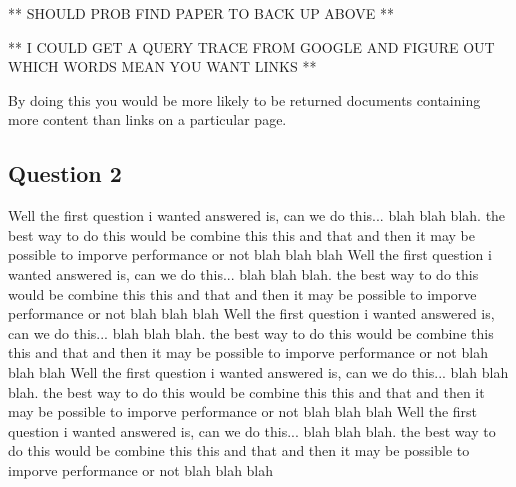 \documentclass{acm_proc_article-sp}
\begin{document}
** SHOULD PROB FIND PAPER TO BACK UP ABOVE **

** I COULD GET A QUERY TRACE FROM GOOGLE AND FIGURE OUT WHICH WORDS MEAN YOU WANT LINKS **

By doing this you would be more likely to be returned documents containing more content than links on a particular page.

\subsection{Question 2}
Well the first question i wanted answered is, can we do this... blah blah blah. the best way to do this would be combine this this and that and then it may be possible to imporve performance or not blah blah blah
Well the first question i wanted answered is, can we do this... blah blah blah. the best way to do this would be combine this this and that and then it may be possible to imporve performance or not blah blah blah
Well the first question i wanted answered is, can we do this... blah blah blah. the best way to do this would be combine this this and that and then it may be possible to imporve performance or not blah blah blah
Well the first question i wanted answered is, can we do this... blah blah blah. the best way to do this would be combine this this and that and then it may be possible to imporve performance or not blah blah blah
Well the first question i wanted answered is, can we do this... blah blah blah. the best way to do this would be combine this this and that and then it may be possible to imporve performance or not blah blah blah
\end{document}

